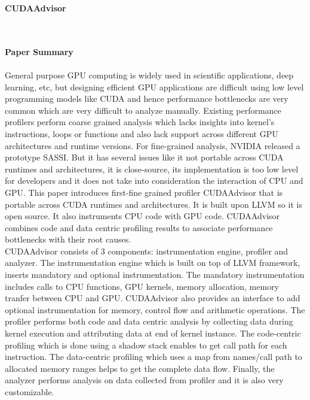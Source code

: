 \documentclass[20pt]{letter}
\begin{document}
\begin{enumerate}
{ \Large
\begin{center}
    \textbf{CUDAAdvisor}
\end{center}
}
{ \fontsize{13}{17}\selectfont\\

\textbf{\\Paper Summary}\\\\
General purpose GPU computing is widely used in scientific applications, deep learning, etc, but designing efficient GPU applications are difficult using low level programming models like CUDA and hence performance bottlenecks are very common which are very difficult to analyze manually. Existing performance profilers perform coarse grained analysis which lacks insights into kernel's instructions, loops or functions and also lack support across different GPU architectures and runtime versions. For fine-grained analysis, NVIDIA released a prototype SASSI. But it has several issues like it not portable across CUDA runtimes and architectures, it is close-source, its implementation is too low level for developers and it does not take into consideration the interaction of CPU and GPU. This paper introduces first-fine grained profiler CUDAAdvisor that is portable across CUDA runtimes and architectures. It is built upon LLVM so it is open source. It also instruments CPU code with GPU code. CUDAAdvisor combines code and data centric profiling results to associate performance bottlenecks with their root causes.\\
CUDAAdvisor consists of 3 components: instrumentation engine, profiler and analyzer. The instrumentation engine which is built on top of LLVM framework, inserts mandatory and optional instrumentation. The mandatory instrumentation includes calls to CPU functions, GPU kernels, memory allocation, memory tranfer between CPU and GPU. CUDAAdvisor also provides an interface to add optional instrumentation for memory, control flow and arithmetic operations. The profiler performs both code and data centric analysis by collecting data during kernel execution and attributing data at end of kernel instance. The code-centric profiling which is done using a shadow stack enables to get call path for each instruction. The data-centric profiling which uses a map from names/call path to allocated memory ranges helps to get the complete data flow. Finally, the analyzer performs analysis on data collected from profiler and it is also very customizable.\\
}
\end{enumerate}
\end{document}

